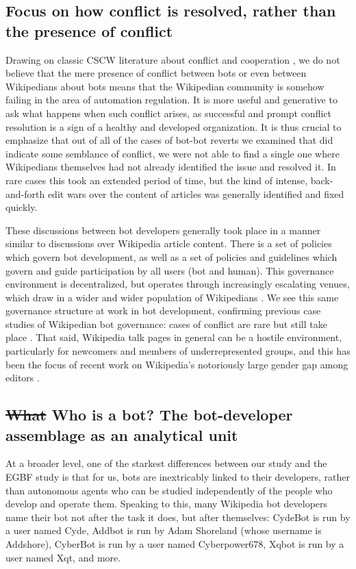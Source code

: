 \documentclass[format=acmsmall, review=false, screen=true]{acmart}%
\DeclareRobustCommand{\hsout}[1]{\texorpdfstring{\sout{#1}}{#1}}
\begin{document}
\subsection{Focus on how conflict is resolved, rather than the presence of conflict}
Drawing on classic CSCW literature about conflict and cooperation \cite{Kling1991, Easterbrook1993}, we do not believe that the mere presence of conflict between bots or even between Wikipedians about bots means that the Wikipedian community is somehow failing in the area of automation regulation. It is more useful and generative to ask what happens when such conflict arises, as successful and prompt conflict resolution is a sign of a healthy and developed organization. It is thus crucial to emphasize that out of all of the cases of bot-bot reverts we examined that did indicate some semblance of conflict, we were not able to find a single one where Wikipedians themselves had not already identified the issue and resolved it. In rare cases this took an extended period of time, but the kind of intense, back-and-forth edit wars over the content of articles was generally identified and fixed quickly.

These discussions between bot developers generally took place in a manner similar to discussions over Wikipedia article content. There is a set of policies which govern bot development, as well as a set of policies and guidelines which govern and guide participation by all users (bot and human). This governance environment is decentralized, but operates through increasingly escalating venues, which draw in a wider and wider population of Wikipedians \cite{Bruckman2008, Butler2008, Geiger2010, Konieczny2010, Tkacz2015}. We see this same governance structure at work in bot development, confirming previous case studies of Wikipedian bot governance: cases of conflict are rare but still take place \cite{Muller-Birn2013, Geiger2011a}. That said, Wikipedia talk pages in general can be a hostile environment, particularly for newcomers and members of underrepresented groups, and this has been the focus of recent work on Wikipedia's notoriously large gender gap among editors \cite{Laniado2012,Lam2011,Reagle2012,Menking2015}. 

\subsection{\hsout{What} Who is a bot? The bot-developer assemblage as an analytical unit}
At a broader level, one of the starkest differences between our study and the EGBF study is that for us, bots are inextricably linked to their developers, rather than autonomous agents who can be studied independently of the people who develop and operate them. Speaking to this, many Wikipedia bot developers name their bot not after the task it does, but after themselves: CydeBot is run by a user named Cyde, Addbot is run by Adam Shoreland (whose username is Addshore), CyberBot is run by a user named Cyberpower678, Xqbot is run by a user named Xqt, and more.
\end{document}
